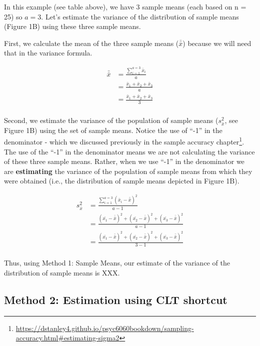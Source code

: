\documentclass[
]{krantz}
\renewcommand{\href}[2]{#2\footnote{\url{#1}}}
\begin{document}
In this example (see table above), we have 3 sample means (each based on n = 25) so \(a = 3\). Let's estimate the variance of the distribution of sample means (Figure 1B) using these three sample means.

First, we calculate the mean of the three sample means (\(\bar{\bar{x}}\)) because we will need that in the variance formula.

\[
\begin{aligned} 
\bar{\bar{x}} &= \frac{\sum_{i=1}^{a=3}{\bar{x}_i}}{a}\\
&= \frac{\bar{x}_1+\bar{x}_2+\bar{x}_3}{a}\\
&= \frac{\bar{x}_1+\bar{x}_2+\bar{x}_3}{3}\\
\end{aligned} 
\]

Second, we estimate the variance of the population of sample means (\(s_{\bar{x}}^2\), see Figure 1B) using the set of sample means. Notice the use of ``-1'' in the denominator - \href{https://dstanley4.github.io/psyc6060bookdown/sampling-accuracy.html\#estimating-sigma2}{which we discussed previously in the sample accuracy chapter}. The use of the ``-1'' in the denominator means we are not calculating the variance of these three sample means. Rather, when we use ``-1'' in the denominator we are \textbf{estimating} the variance of the population of sample means from which they were obtained (i.e., the distribution of sample means depicted in Figure 1B).

\[
\begin{aligned} 
s_{\bar{x}}^2 &= \frac{\sum_{i=1}^{a=3}{(\bar{x}_i - \bar{\bar{x}})^2}}{a-1}\\
&= \frac{(\bar{x_1}- \bar{\bar{x}})^2+(\bar{x_2}- \bar{\bar{x}})^2+(\bar{x_3}- \bar{\bar{x}})^2}{a-1}\\
&= \frac{(\bar{x_1}- \bar{\bar{x}})^2+(\bar{x_2}- \bar{\bar{x}})^2+(\bar{x_3}- \bar{\bar{x}})^2}{3-1}\\
\end{aligned} 
\]

Thus, using Method 1: Sample Means, our estimate of the variance of the distribution of sample means is XXX.

\hypertarget{method-2-estimation-using-clt-shortcut}{%
\subsection{Method 2: Estimation using CLT shortcut}\label{method-2-estimation-using-clt-shortcut}}
\end{document}
